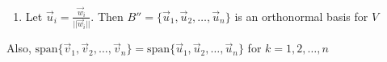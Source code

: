 \documentclass[15pt]{article}
\begin{document}
\begin{flushleft}
\begin{itemize}
\begin{enumerate}
\begin{align*}
                            \vec{w}_3 &= \vec{v}_3 - \frac{\langle \vec{v}_3,
                            \vec{w}_1 \rangle}{\langle \vec{w}_1, \vec{w}_1 
                            \rangle} \vec{w}_1 - \frac{\langle \vec{v}_3,
                            \vec{w}_2 \rangle}{\langle \vec{w}_2, \vec{w}_2 
                            \rangle} \vec{w}_2                                  \\
                            \vdots                                              \\
                            \vec{w}_n &= \vec{v}_n - \frac{\langle \vec{v}_n,
                            \vec{w}_1 \rangle}{\langle \vec{w}_1, \vec{w}_1 
                            \rangle} \vec{w}_1 - \frac{\langle \vec{v}_n, 
                            \vec{w}_2 \rangle} {\langle \vec{w}_2, \vec{w}_2 
                            \rangle} \vec{w}_2 - \dots - \frac{\langle 
                            \vec{v}_n, \vec{w}_{n-1} \rangle} {\langle 
                            \vec{w}_{n-1}, \vec{w}_{n-1} \rangle} \vec{w}_{n-1}
                        \end{align*}
                        Then $B'$ is an orthonormal basis for $V$
                \item Let $\vec{u}_i = \frac{\vec{w}_i}{||\vec{w}_i||}$. Then
                        $B'' = \{ \vec{u}_1, \vec{u}_2, \ldots, \vec{u}_n \}$ is
                        an orthonormal basis for $V$
            \end{enumerate}
            Also, $\text{span}\{ \vec{v}_1, \vec{v}_2, \ldots, \vec{v}_n \} =
            \text{span}\{ \vec{u}_1, \vec{u}_2, \ldots, \vec{u}_n \}$ for $k =
            1,2,\ldots, n$
\end{itemize}


\end{flushleft}
\end{document}
